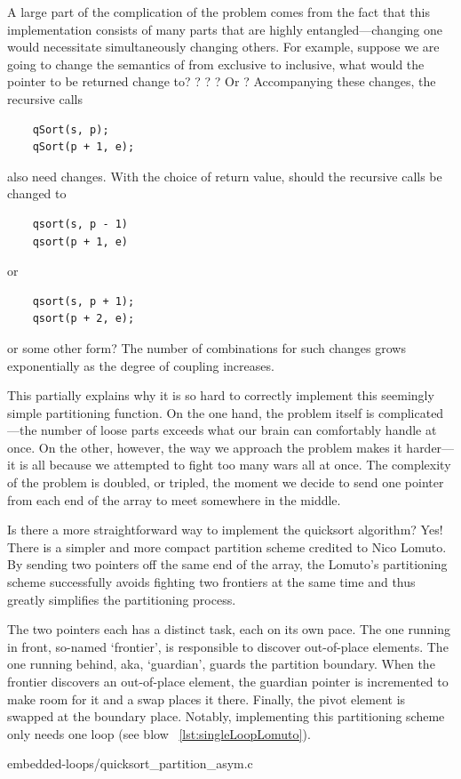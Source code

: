 A large part of the complication of the problem comes from the fact that this implementation
consists of many parts that are highly entangled---changing one would necessitate simultaneously
changing others.
For example,
suppose we are going to change the semantics of  from exclusive to inclusive, what
would the pointer to be returned change to?
? ? ? Or ?
Accompanying these changes, the recursive calls
\begin{lstlisting}
    qSort(s, p);
    qSort(p + 1, e);
\end{lstlisting}
also need changes.
With the choice of return value, should the recursive calls be changed to
\begin{lstlisting}
    qsort(s, p - 1)
    qsort(p + 1, e)
\end{lstlisting}
or
\begin{lstlisting}
    qsort(s, p + 1);
    qsort(p + 2, e);
\end{lstlisting}
or some other form?
The number of combinations for such changes grows exponentially as the degree of coupling increases.


This partially explains why it is so hard to correctly implement this seemingly simple partitioning
function.
On the one hand, the problem itself is complicated---the number of loose parts exceeds what our
brain can comfortably handle at once.
On the other, however, the way we approach the problem makes it harder---it is all because
we attempted to fight too many wars all at once.
The complexity of the problem is doubled, or tripled, the moment we decide to send one pointer
from each end of the array to meet somewhere in the middle.


Is there a more straightforward way to implement the quicksort algorithm?
Yes!
There is a simpler and more compact partition scheme credited to Nico Lomuto\cite{Bentley:1986:PP}.
By sending two pointers off the same end of the array, the Lomuto's partitioning scheme
successfully avoids fighting two frontiers at the same time and thus greatly simplifies the
partitioning process.


The two pointers each has a distinct task, each on its own pace.
The one running in front, so-named `frontier', is responsible to discover out-of-place elements.
The one running behind, aka, `guardian', guards the partition boundary.
When the frontier discovers an out-of-place element, the guardian pointer is incremented to make
room for it and a swap places it there.
Finally, the pivot element is swapped at the boundary place.
Notably, implementing this partitioning scheme only needs one loop
(see blow ~\autoref{lst:singleLoopLomuto}).

{embedded-loops/quicksort_partition_asym.c}


